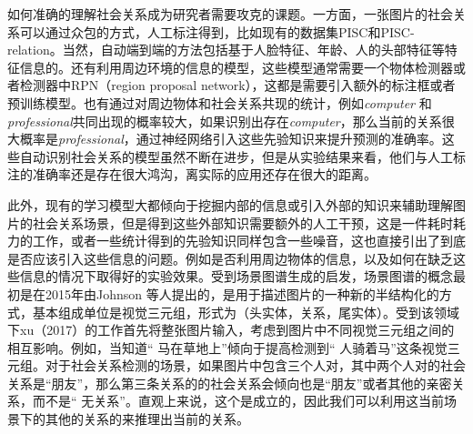 如何准确的理解社会关系成为研究者需要攻克的课题。一方面，一张图片的社会关系可以通过众包的方式，人工标注得到，比如现有的数据集PISC\cite{li2017dual-glance}和PISC-relation\cite{sun2017a}。当然，自动端到端的方法包括基于人脸特征、年龄、人的头部特征等特征信息的\cite{sun2017a,zhang2015learning}。还有利用周边环境的信息的模型\cite{li2017dual-glance,wang2018deep}，这些模型通常需要一个物体检测器或者检测器中RPN（region proposal network），这都是需要引入额外的标注框或者预训练模型。也有通过对周边物体和社会关系共现的统计，例如{\it computer} 和{\it professional}共同出现的概率较大，如果识别出存在{\it computer}，那么当前的关系很大概率是{\it professional}，通过神经网络引入这些先验知识来提升预测的准确率。这些自动识别社会关系的模型虽然不断在进步，但是从实验结果来看，他们与人工标注的准确率还是存在很大鸿沟，离实际的应用还存在很大的距离。

此外，现有的学习模型大都倾向于挖掘内部的信息或引入外部的知识来辅助理解图片的社会关系场景，但是得到这些外部知识需要额外的人工干预，这是一件耗时耗力的工作，或者一些统计得到的先验知识同样包含一些噪音，这也直接引出了到底是否应该引入这些信息的问题。例如是否利用周边物体的信息，以及如何在缺乏这些信息的情况下取得好的实验效果。受到场景图谱生成的启发，场景图谱的概念最初是在2015年由Johnson 等人\cite{johnson2015image}提出的，是用于描述图片的一种新的半结构化的方式，基本组成单位是视觉三元组，形式为（头实体，关系，尾实体）。受到该领域下xu（2017）\cite{xu2017scene}的工作首先将整张图片输入，考虑到图片中不同视觉三元组之间的相互影响。例如，当知道`` 马在草地上''倾向于提高检测到`` 人骑着马''这条视觉三元组。对于社会关系检测的场景，如果图片中包含三个人对，其中两个人对的社会关系是``朋友''，那么第三条关系的的社会关系会倾向也是``朋友''或者其他的亲密关系，而不是`` 无关系''。直观上来说，这个是成立的，因此我们可以利用这当前场景下的其他的关系的来推理出当前的关系。


